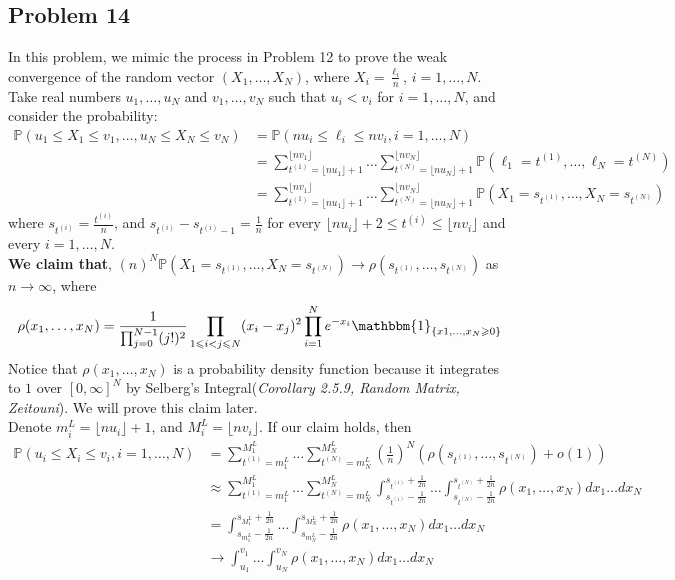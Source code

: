 \documentclass[12pt]{article}
\begin{document}
\subsection*{Problem 14}
In this problem, we mimic the process in Problem 12 to prove the weak convergence of the random vector $(X_{1},\dots,X_{N})$, where $X_{i}=\frac{\ell_{i}}{n}$, $i=1,\dots,N$. Take real numbers $u_{1},\dots, u_{N}$ and $v_{1},\dots, v_{N}$ such that $u_{i}<v_{i}$ for $i=1,\dots, N$, and consider the probability: 
\begin{align*}
\mathbb{P}(u_{1}\leqslant X_{1} \leqslant v_{1}, \dots,  u_{N}\leqslant X_{N} \leqslant v_{N})&=\mathbb{P}(nu_{i}\leqslant \ell_{i} \leqslant nv_{i}, i=1,\dots, N)	\\
&=\sum_{t^{(1)}=\lfloor nu_{1}\rfloor+1}^{\lfloor nv_{1}\rfloor}\dots \sum_{t^{(N)}=\lfloor nu_{N}\rfloor+1}^{\lfloor nv_{N}\rfloor}\mathbb{P}(\ell_{1}=t^{(1)},\dots,\ell_{N}=t^{(N)})\\
&=\sum_{t^{(1)}=\lfloor nu_{1}\rfloor+1}^{\lfloor nv_{1}\rfloor}\dots \sum_{t^{(N)}=\lfloor nu_{N}\rfloor+1}^{\lfloor nv_{N}\rfloor}\mathbb{P}(X_{1}=s_{t^{(1)}},\dots, X_{N}=s_{t^{(N)}})
\end{align*}
where $s_{t^{(i)}}=\frac{t^{(i)}}{n}$, and $s_{t^{(i)}}-s_{t^{(i)}-1}=\frac{1}{n}$ for every $\lfloor nu_{i}\rfloor +2\leqslant t^{(i)}\leqslant \lfloor nv_{i}\rfloor$ and every $i=1,\dots, N$.\\
\textbf{We claim that}, $(n)^{N}\mathbb{P}(X_{1}=s_{t^{(1)}},\dots,X_{N}=s_{t^{(N)}})\rightarrow \rho(s_{t^{(1)}},\dots, s_{t^{(N)}})$ as $n\rightarrow\infty$, where $$\rho(x_1,\dots, x_{N})=\frac{1}{\prod_{j=0}^{N-1}(j!)^{2}}\prod_{1\leqslant i<j\leqslant N}(x_{i}-x_{j})^2\prod_{i=1}^{N}e^{-x_{i}}\mathbbm{1}_{\{x1,\dots, x_{N}\geqslant 0\}}$$ 
Notice that $\rho(x_1,\dots, x_{N})$ is a probability density function because it integrates to $1$ over $[0,\infty]^{N}$ by Selberg's Integral(\emph{Corollary 2.5.9, Random Matrix, Zeitouni}). We will prove this claim later.\\
Denote $m^{L}_{i}=\lfloor nu_{i}\rfloor+1$, and $M^{L}_{i}=\lfloor nv_{i}\rfloor$. If our claim holds, then
\begin{align*}
\mathbb{P}(u_{i}\leqslant X_{i} \leqslant v_{i}, i=1, \dots, N)&=\sum_{t^{(1)}=m_{1}^{L}}^{M_{1}^{L}}\dots\sum_{t^{(N)}=m_{N}^{L}}^{M_{N}^{L}}(\frac{1}{n})^{N}(\rho(s_{t^{(1)}},\dots, s_{t^{(N)}})+o(1))\\
&\approx \sum_{t^{(1)}=m_{1}^{L}}^{M_{1}^{L}}\dots\sum_{t^{(N)}=m_{N}^{L}}^{M_{N}^{L}}\int_{s_{t^{(1)}}-\frac{1}{2n}}^{s_{t^{(1)}}+\frac{1}{2n}}\dots\int_{s_{t^{(N)}}-\frac{1}{2n}}^{s_{t^{(N)}}+\frac{1}{2n}}\rho(x_1,\dots, x_{N})dx_{1}\dots dx_{N}\\
& = \int_{s_{m^{L}_{1}}-\frac{1}{2n}}^{s_{M^{L}_{1}}+\frac{1}{2n}}\dots\int_{s_{m^{L}_{N}}-\frac{1}{2n}}^{s_{M^{L}_{N}}+\frac{1}{2n}}\rho(x_1,\dots, x_{N})dx_{1}\dots dx_{N}\\
& \rightarrow \int_{u_{1}}^{v_{1}}\dots\int_{u_{N}}^{v_{N}}\rho(x_1,\dots, x_{N})dx_{1}\dots dx_{N}
\end{align*}
\end{document}

